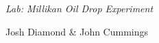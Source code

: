 {\LARGE {\em \noindent Lab: Millikan Oil Drop Experiment}}

\large{\noindent Josh Diamond \& John Cummings}
